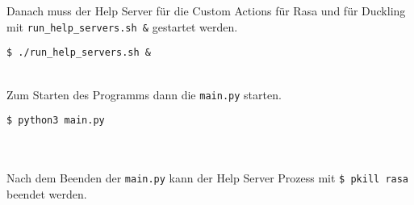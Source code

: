 Danach muss der Help Server für die Custom Actions für Rasa und für Duckling mit \texttt{run\_help\_servers.sh \&} gestartet werden.\\
 \begin{framed}
 	\texttt{\$ ./run\_help\_servers.sh \&}
 \end{framed}
 \hfill\\
 
Zum Starten des Programms dann die \texttt{main.py} starten.\\
  \begin{framed}
 	\texttt{\$ python3 main.py}
 \end{framed}
 \hfill\\\\
 
Nach dem Beenden der \texttt{main.py} kann der Help Server Prozess mit \texttt{\$ pkill rasa} beendet werden.
